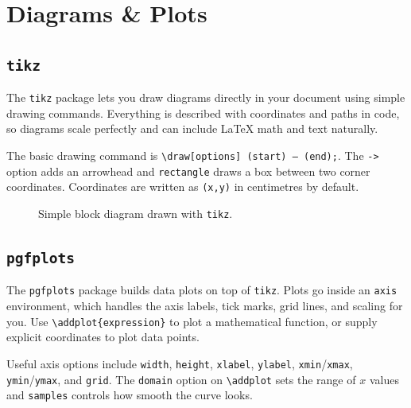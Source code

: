 \section{Diagrams \& Plots}

	\subsection{\texttt{tikz}}
	The \texttt{tikz} package lets you draw diagrams directly in your document using simple drawing commands. Everything is described with coordinates and paths in code, so diagrams scale perfectly and can include \LaTeX{} math and text naturally.
	
	The basic drawing command is \texttt{\textbackslash draw[options] (start) -- (end);}. The \texttt{->} option adds an arrowhead and \texttt{rectangle} draws a box between two corner coordinates. Coordinates are written as \texttt{(x,y)} in centimetres by default.
	
	\begin{figure}[H]
		\centering
		\caption{Simple block diagram drawn with \texttt{tikz}.}
		\label{fig:tikz}
	\end{figure}
	
	\subsection{\texttt{pgfplots}}
	The \texttt{pgfplots} package builds data plots on top of \texttt{tikz}. Plots go inside an \texttt{axis} environment, which handles the axis labels, tick marks, grid lines, and scaling for you. Use \texttt{\textbackslash addplot\{expression\}} to plot a mathematical function, or supply explicit coordinates to plot data points.
	
	Useful axis options include \texttt{width}, \texttt{height}, \texttt{xlabel}, \texttt{ylabel}, \texttt{xmin}/\texttt{xmax}, \texttt{ymin}/\texttt{ymax}, and \texttt{grid}. The \texttt{domain} option on \texttt{\textbackslash addplot} sets the range of $x$ values and \texttt{samples} controls how smooth the curve looks.
	
